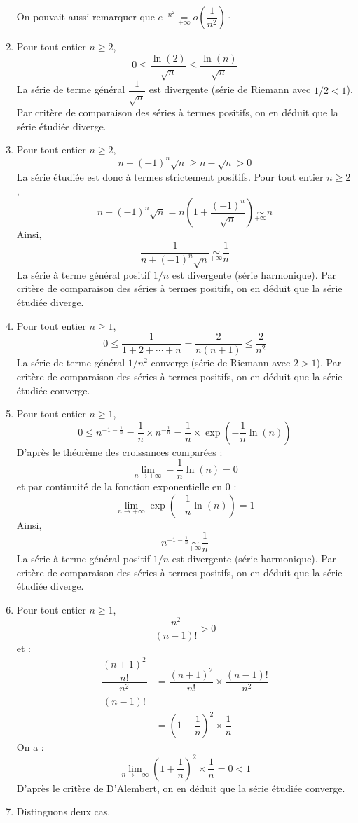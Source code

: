 \documentclass[a4paper,twoside,french,10pt]{VcCours}
\begin{document}
\begin{enumerate}
\noindent On pouvait aussi remarquer que $e^{-n^2} \underset{+ \infty}{=} o \left( \dfrac{1}{n^2} \right) \cdot$
\item Pour tout entier $n \geq 2$,
$$ 0 \leq \dfrac{\ln(2)}{\sqrt{n}} \leq \dfrac{\ln(n)}{\sqrt{n}}$$
La série de terme général $\dfrac{1}{\sqrt{n}}$ est divergente (série de Riemann avec $1/2<1$). Par critère de comparaison des séries à termes positifs, on en déduit que la série étudiée diverge.
\item Pour tout entier $n \geq 2$,
$$ n+(-1)^n \sqrt{n} \geq n- \sqrt{n} >0$$
La série étudiée est donc à termes strictement positifs. Pour tout entier $n \geq 2$,
$$ n+(-1)^n \sqrt{n} = n \left( 1 + \dfrac{(-1)^n}{\sqrt{n}} \right) \underset{+ \infty}{\sim} n$$
Ainsi,
$$ \dfrac{1}{n+(-1)^n \sqrt{n}} \underset{+ \infty}{\sim} \dfrac{1}{n}$$
La série à terme général positif $1/n$ est divergente (série harmonique). Par critère de comparaison des séries à termes positifs, on en déduit que la série étudiée diverge.
\item Pour tout entier $n \geq 1$,
$$ 0 \leq \dfrac{1}{1+2+ \cdots + n}  = \dfrac{2}{n(n+1)} \leq \dfrac{2}{n^2}$$
La série de terme général $1/n^2$ converge (série de Riemann avec $2>1$). Par critère de comparaison des séries à termes positifs, on en déduit que la série étudiée converge.
\item Pour tout entier $n \geq 1$,
$$ 0 \leq n^{-1- \frac{1}{n}} = \dfrac{1}{n} \times n^{- \frac{1}{n}} = \dfrac{1}{n} \times \exp \left( - \dfrac{1}{n} \ln(n) \right)$$
D'après le théorème des croissances comparées :
$$ \lim_{n \rightarrow + \infty}  - \dfrac{1}{n} \ln(n) = 0$$
et par continuité de la fonction exponentielle en $0$ :
$$ \lim_{n \rightarrow + \infty}  \exp \left( - \dfrac{1}{n} \ln(n) \right) = 1$$
Ainsi,
$$ n^{-1- \frac{1}{n}}  \underset{+ \infty}{\sim} \dfrac{1}{n}$$
La série à terme général positif $1/n$ est divergente (série harmonique). Par critère de comparaison des séries à termes positifs, on en déduit que la série étudiée diverge.
\item Pour tout entier $n \geq 1$,
$$  \dfrac{n^2}{(n-1)!} >0$$
et :
\begin{align*}
\dfrac{ \dfrac{(n+1)^2}{n!}}{ \dfrac{n^2}{(n-1)!}}  & = \dfrac{(n+1)^2}{n!} \times \dfrac{(n-1)!}{n^2} \\
& = \left(1+ \dfrac{1}{n}\right)^2 \times \dfrac{1}{n}
\end{align*}
On a :
$$ \lim_{n \rightarrow + \infty}  \left(1+ \dfrac{1}{n}\right)^2 \times \dfrac{1}{n} = 0 <1$$
D'après le critère de D'Alembert, on en déduit que la série étudiée converge.
\item Distinguons deux cas.


\end{enumerate}
\end{document}
